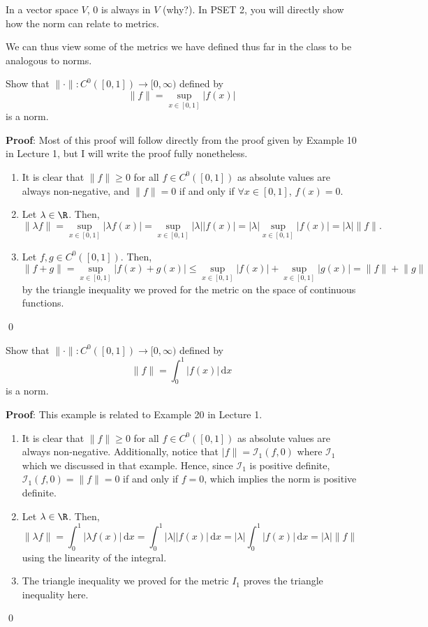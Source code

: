 \begin{remark}
In a vector space $V$, $0$ is always in $V$ (why?). In PSET 2, you will directly show how the norm can relate to metrics.
\end{remark}
We can thus view some of the metrics we have defined thus far in the class to be analogous to norms. 
\begin{example}
Show that $\lVert \cdot\rVert: C^0([0,1])\to [0,\infty)$ defined by 
\[
\lVert f\rVert = \sup_{x\in [0,1]} |f(x)|
\]
is a norm.
\end{example}
\textbf{Proof}: Most of this proof will follow directly from the proof given by Example 10 in Lecture 1, but I will write the proof fully nonetheless.
\begin{enumerate}
    \item It is clear that $\lVert f\rVert \geq 0$ for all $f\in C^0([0,1])$ as absolute values are always non-negative, and $\lVert f\rVert = 0$ if and only if $\forall x\in [0,1]$, $f(x) = 0$.
    \item Let $\lambda \in \R$. Then, \[\lVert \lambda f\rVert  = \sup_{x\in [0,1]}|\lambda f(x)| = \sup_{x\in [0,1]}|\lambda| |f(x)| = |\lambda |\sup_{x\in [0,1]}|f(x)| = |\lambda| \lVert f\rVert.\]
    \item Let $f,g\in C^0([0,1])$. Then, 
    \[
    \lVert f + g\rVert = \sup_{x\in [0,1]} |f(x) + g(x)| \leq  \sup_{x\in [0,1]} |f(x) | +  \sup_{x\in [0,1]} |g(x)| = \lVert f\rVert + \lVert g\rVert
    \]
    by the triangle inequality we proved for the metric on the space of continuous functions.
\end{enumerate}
\qed 

\begin{example}
Show that $\lVert \cdot\rVert: C^0([0,1])\to [0,\infty)$ defined by 
\[
\lVert f\rVert  = \int_0^1 |f(x)|\,\mathrm dx
\]
is a norm.
\end{example}
\textbf{Proof}: This example is related to Example 20 in Lecture 1.
\begin{enumerate}
    \item It is clear that $\lVert f\rVert \geq 0$ for all $f\in C^0([0,1])$ as absolute values are always non-negative. Additionally, notice that $\lvert f\rVert = \mathcal I_1(f,0)$ where $\mathcal I_1$ which we discussed in that example. Hence, since $\mathcal I_1$ is positive definite, $\mathcal I_1(f,0) =\lVert f \rVert = 0$ if and only if $f = 0$, which implies the norm is positive definite.
    \item Let $\lambda \in \R$. Then, \[\lVert \lambda f\rVert = \int_0^1 |\lambda f(x)|\,\mathrm dx = \int_0^1 |\lambda| | f(x)|\,\mathrm dx = |\lambda |\int_0^1|f(x)|\,\mathrm dx = |\lambda| \lVert f\rVert\] using the linearity of the integral.
    
    \item The triangle inequality we proved for the metric $I_1$ proves the triangle inequality here.
\end{enumerate}
\qed 

